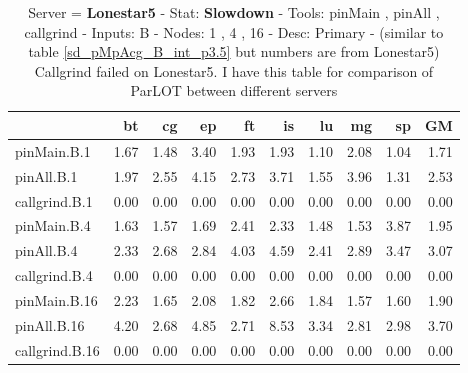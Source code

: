 \begin{table*}[]
\caption{Server = \textbf{Lonestar5} - Stat: \textbf{Slowdown} -  
 Tools: pinMain , pinAll , callgrind -
 Inputs: B -
 Nodes: 1 , 4 , 16 -
 Desc: Primary - (similar to table \ref{sd_pMpAcg_B_int_p3.5} but numbers are from Lonestar5) Callgrind failed on Lonestar5. I have this table for comparison of ParLOT between different servers}
\label{ls5_sd_pMpAcg_B_int_p3.5}\begin{center}
\begin{tabular}{|l|rrrrrrrr|r|}
\hline
                &   bt &   cg &   ep &   ft &   is &   lu &   mg &   sp &   GM \\
\hline
 pinMain.B.1    & 1.67 & 1.48 & 3.40 & 1.93 & 1.93 & 1.10 & 2.08 & 1.04 & 1.71 \\
 pinAll.B.1     & 1.97 & 2.55 & 4.15 & 2.73 & 3.71 & 1.55 & 3.96 & 1.31 & 2.53 \\
 callgrind.B.1  & 0.00 & 0.00 & 0.00 & 0.00 & 0.00 & 0.00 & 0.00 & 0.00 & 0.00 \\
\hline
 pinMain.B.4    & 1.63 & 1.57 & 1.69 & 2.41 & 2.33 & 1.48 & 1.53 & 3.87 & 1.95 \\
 pinAll.B.4     & 2.33 & 2.68 & 2.84 & 4.03 & 4.59 & 2.41 & 2.89 & 3.47 & 3.07 \\
 callgrind.B.4  & 0.00 & 0.00 & 0.00 & 0.00 & 0.00 & 0.00 & 0.00 & 0.00 & 0.00 \\
\hline
 pinMain.B.16   & 2.23 & 1.65 & 2.08 & 1.82 & 2.66 & 1.84 & 1.57 & 1.60 & 1.90 \\
 pinAll.B.16    & 4.20 & 2.68 & 4.85 & 2.71 & 8.53 & 3.34 & 2.81 & 2.98 & 3.70 \\
 callgrind.B.16 & 0.00 & 0.00 & 0.00 & 0.00 & 0.00 & 0.00 & 0.00 & 0.00 & 0.00 \\
\hline
\end{tabular}
\end{center}
\end{table*}
